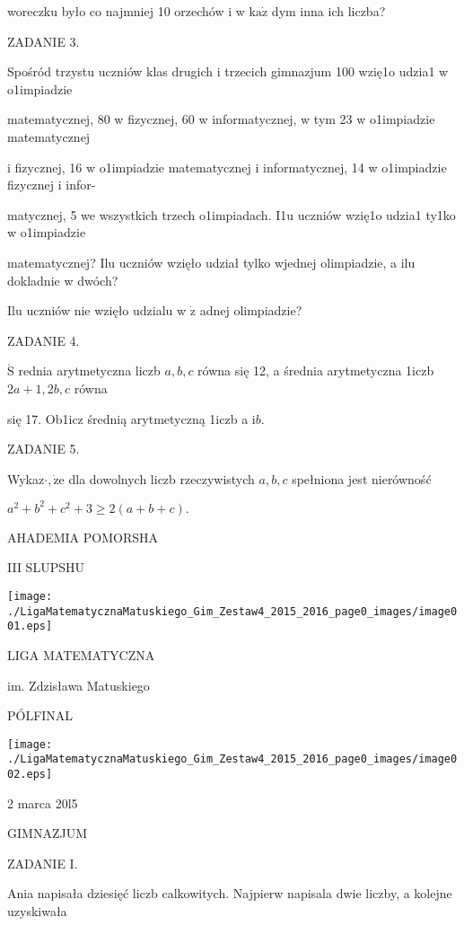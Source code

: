 \documentclass[a4paper,12pt]{article}
\begin{document}
woreczku było co najmniej 10 orzechów i w $\mathrm{k}\mathrm{a}\dot{\mathrm{z}}$ dym inna ich liczba?

ZADANIE 3.

Spośród trzystu uczniów klas drugich i trzecich gimnazjum 100 wzię1o udzia1 w o1impiadzie

matematycznej, 80 w fizycznej, 60 w informatycznej, w tym 23 w o1impiadzie matematycznej

i fizycznej, 16 w o1impiadzie matematycznej i informatycznej, 14 w o1impiadzie fizycznej i infor-

matycznej, 5 we wszystkich trzech o1impiadach. I1u uczniów wzię1o udzia1 ty1ko w o1impiadzie

matematycznej? Ilu uczniów wzięło udział tylko wjednej olimpiadzie, a ilu dokladnie w dwóch?

Ilu uczniów nie wzięło udzialu w $\dot{\mathrm{z}}$ adnej olimpiadzie?

ZADANIE 4.

$\acute{\mathrm{S}}$ rednia arytmetyczna liczb $a, b, c$ równa się 12, a średnia arytmetyczna 1iczb $2a+1, 2b, c$ równa

się 17. Ob1icz średnią arytmetyczną 1iczb a $\mathrm{i}b.$

ZADANIE 5.

Wykaz$\cdot, \dot{\mathrm{z}}\mathrm{e}$ dla dowolnych liczb rzeczywistych $a, b, c$ spełniona jest nierówność

$a^{2}+b^{2}+c^{2}+3\geq 2(a+b+c).$






AHADEMIA POMORSHA

III SLUPSHU
\begin{center}
\texttt{[image: ./LigaMatematycznaMatuskiego\_Gim\_Zestaw4\_2015\_2016\_page0\_images/image001.eps]}
\end{center}
LIGA MATEMATYCZNA

im. Zdzisława Matuskiego

PÓLFINAL
\begin{center}
\texttt{[image: ./LigaMatematycznaMatuskiego\_Gim\_Zestaw4\_2015\_2016\_page0\_images/image002.eps]}
\end{center}
2 marca 20l5

GIMNAZJUM

ZADANIE I.

Ania napisała dziesięć liczb calkowitych. Najpierw napisala dwie liczby, a kolejne uzyskiwała
\end{document}
